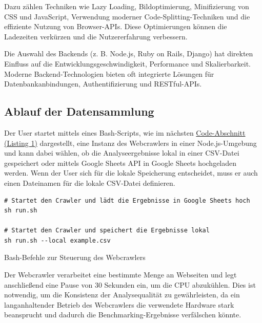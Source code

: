 \documentclass[Bachelor,BIF,german,IEEE]{BASE/twbook}
\begin{document}
\begin{description}[style=nextline, itemsep=1.5ex]
    \item [\textbf{Performance-Optimierungen (z. B. content-encoding usw.)}] 
    Dazu zählen Techniken wie Lazy Loading, Bildoptimierung, Minifizierung von CSS und JavaScript, Verwendung moderner Code-Splitting-Techniken und die effiziente Nutzung von Browser-APIs. Diese Optimierungen können die Ladezeiten verkürzen und die Nutzererfahrung verbessern.
    \item [\textbf{Backend-Technologien (z. B. WordPress, Joomla, etc.)}] 
    Die Auswahl des Backends (z. B. Node.js, Ruby on Rails, Django) hat direkten Einfluss auf die Entwicklungsgeschwindigkeit, Performance und Skalierbarkeit. Moderne Backend-Technologien bieten oft integrierte Lösungen für Datenbankanbindungen, Authentifizierung und RESTful-APIs.
\end{description}

\subsection{Ablauf der Datensammlung}
Der User startet mittels eines Bash-Scripts, wie im nächsten \hyperref[code:bash]{Code-Abschnitt (Listing 1)} dargestellt, eine Instanz des Webcrawlers in einer Node.js-Umgebung und kann dabei wählen, ob die Analyseergebnisse lokal in einer CSV-Datei gespeichert oder mittels Google Sheets API in Google Sheets hochgeladen werden. Wenn der User sich für die lokale Speicherung entscheidet, muss er auch einen Dateinamen für die lokale CSV-Datei definieren.

\begin{listing}[htbp]
\begin{verbatim}
# Startet den Crawler und lädt die Ergebnisse in Google Sheets hoch
sh run.sh

# Startet den Crawler und speichert die Ergebnisse lokal
sh run.sh --local example.csv
\end{verbatim}
\caption{Bash-Befehle zur Steuerung des Webcrawlers}
\label{code:bash}
\end{listing}


\noindent Der Webcrawler verarbeitet eine bestimmte Menge an Webseiten und legt anschließend eine Pause von 30 Sekunden ein, um die CPU abzukühlen. Dies ist notwendig, um die Konsistenz der Analysequalität zu gewährleisten, da ein langanhaltender Betrieb des Webcrawlers die verwendete Hardware stark beansprucht und dadurch die Benchmarking-Ergebnisse verfälschen könnte.\newline
\end{document}
